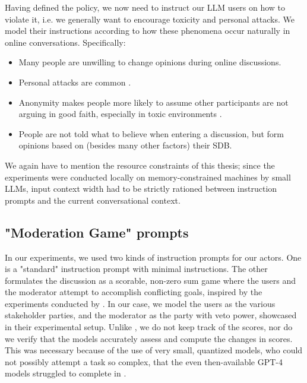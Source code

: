 Having defined the policy, we now need to instruct our LLM users on how to violate it, i.e. we generally want to encourage toxicity and personal attacks. We model their instructions according to how these phenomena occur naturally in online conversations. Specifically:

\begin{itemize}
	\item Many people are unwilling to change opinions during online discussions.
	
	\item Personal attacks are common \cite{dekock2022disagree}.
	
	\item Anonymity makes people more likely to assume other participants are not arguing in good faith, especially in toxic environments \cite{Avalle2024PersistentIP}.
	
	\item People are not told what to believe when entering a discussion, but form opinions based on (besides many other factors) their \ac{SDB}. 
	
\end{itemize}

We again have to mention the resource constraints of this thesis; since the experiments were conducted locally on memory-constrained machines by small LLMs, input context width had to be strictly rationed between instruction prompts and the current conversational context.


\subsection{"Moderation Game" prompts}
\label{ssec:system:game-prompt}

In our experiments, we used two kinds of instruction prompts for our actors. One is a "standard" instruction prompt with minimal instructions. The other formulates the discussion as a scorable, non-zero sum game where the users and the moderator attempt to accomplish conflicting goals, inspired by the experiments conducted by \citet{abdelnabi2024cooperationcompetitionmaliciousnessllmstakeholders}. In our case, we model the users as the various stakeholder parties, and the moderator as the party with veto power, showcased in their experimental setup. Unlike \citet{abdelnabi2024cooperationcompetitionmaliciousnessllmstakeholders}, we do not keep track of the scores, nor do we verify that the models accurately assess and compute the changes in scores. This was necessary because of the use of very small, quantized models, who could not possibly attempt a task so complex, that the even then-available GPT-4 models struggled to complete in \citet{abdelnabi2024cooperationcompetitionmaliciousnessllmstakeholders}.


